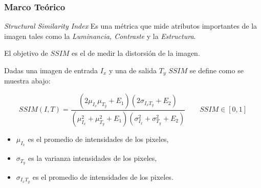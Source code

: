 \documentclass[usenames,dvipsnames]{beamer}
\begin{document}
\begin{frame} 

\frametitle{Marco Teórico} 
\begin{exampleblock}{\textit{Structural Similarity Index}}
Es una métrica que mide atributos importantes de la imagen tales como la \textit{Luminancia, Contraste} y la \textit{Estructura}.

El objetivo de $SSIM$ es el de medir la distorsión de la imagen.

Dadas una imagen de entrada $I_x$ y una de salida $T_y$ $SSIM$ se define como se muestra abajo:

\end{exampleblock}
\vspace{-0.5cm}
\begin{equation}
SSIM(I,T) = \frac{(2\mu_{I_x} \mu_{T_y}+E_1)(2\sigma_{I_xT_y}+E_2)}{(\mu^2_{I_x}+\mu^2_{T_y}+E_1)(\sigma^2_{I_x} + \sigma^2_{T_y}+E_2)} \qquad SSIM \in [0,1]
\end{equation}

\begin{itemize}
	\item $\mu_{I_x}$ es el promedio de intensidades de los pixeles,
	\item $\sigma_{T_y}$ es la varianza intensidades de los pixeles,
	\item $\sigma_{I_xT_y}$ es el promedio de intensidades de los pixeles.
\end{itemize}

\end{frame}    
\end{document}

